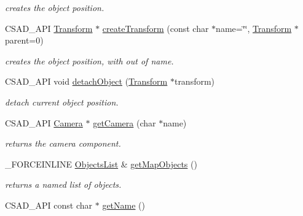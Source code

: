 \begin{DoxyCompactItemize}
\begin{DoxyCompactList}\small\item\em creates the object position. \end{DoxyCompactList}\item 
\hypertarget{classcsad_1_1_scene_a78ce909788631685692501979b0e46bd}{C\-S\-A\-D\-\_\-\-A\-P\-I \hyperlink{classcsad_1_1_transform}{Transform} $\ast$ \hyperlink{classcsad_1_1_scene_a78ce909788631685692501979b0e46bd}{create\-Transform} (const char $\ast$name=\char`\"{}\char`\"{}, \hyperlink{classcsad_1_1_transform}{Transform} $\ast$parent=0)}\label{classcsad_1_1_scene_a78ce909788631685692501979b0e46bd}

\begin{DoxyCompactList}\small\item\em creates the object position, with out of name. \end{DoxyCompactList}\item 
\hypertarget{classcsad_1_1_scene_a48c5a40cad1ba71ae8400b621917a4d5}{C\-S\-A\-D\-\_\-\-A\-P\-I void \hyperlink{classcsad_1_1_scene_a48c5a40cad1ba71ae8400b621917a4d5}{detach\-Object} (\hyperlink{classcsad_1_1_transform}{Transform} $\ast$transform)}\label{classcsad_1_1_scene_a48c5a40cad1ba71ae8400b621917a4d5}

\begin{DoxyCompactList}\small\item\em detach current object position. \end{DoxyCompactList}\item 
\hypertarget{classcsad_1_1_scene_a816697937e32ba2a52d23ff641ee94c3}{C\-S\-A\-D\-\_\-\-A\-P\-I \hyperlink{classcsad_1_1_camera}{Camera} $\ast$ \hyperlink{classcsad_1_1_scene_a816697937e32ba2a52d23ff641ee94c3}{get\-Camera} (char $\ast$name)}\label{classcsad_1_1_scene_a816697937e32ba2a52d23ff641ee94c3}

\begin{DoxyCompactList}\small\item\em returns the camera component. \end{DoxyCompactList}\item 
\hypertarget{classcsad_1_1_scene_a3f600e717cfb1a27201f9b86b7e9c5c3}{\-\_\-\-F\-O\-R\-C\-E\-I\-N\-L\-I\-N\-E \hyperlink{classbt_1_1_map_name}{Objects\-List} \& \hyperlink{classcsad_1_1_scene_a3f600e717cfb1a27201f9b86b7e9c5c3}{get\-Map\-Objects} ()}\label{classcsad_1_1_scene_a3f600e717cfb1a27201f9b86b7e9c5c3}

\begin{DoxyCompactList}\small\item\em returns a named list of objects. \end{DoxyCompactList}\item 
\hypertarget{classcsad_1_1_scene_a1c83dad87a993877e9f083a64904626a}{C\-S\-A\-D\-\_\-\-A\-P\-I const char $\ast$ \hyperlink{classcsad_1_1_scene_a1c83dad87a993877e9f083a64904626a}{get\-Name} ()}\label{classcsad_1_1_scene_a1c83dad87a993877e9f083a64904626a}


\end{DoxyCompactItemize}
